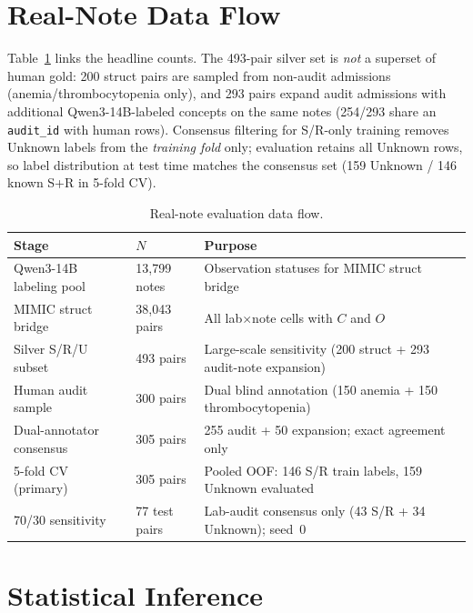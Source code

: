 \documentclass[11pt]{article}
\begin{document}
\section{Real-Note Data Flow}
\label{app:data_flow}

Table~\ref{tab:data_flow} links the headline counts. The 493-pair silver set
is \emph{not} a superset of human gold: 200 struct pairs are sampled from
non-audit admissions (anemia/thrombocytopenia only), and 293 pairs expand audit
admissions with additional Qwen3-14B-labeled concepts on the same notes
(254/293 share an \texttt{audit\_id} with human rows). Consensus filtering
for S/R-only training removes Unknown labels from the \emph{training fold} only;
evaluation retains all Unknown rows, so label distribution at test time matches
the consensus set (159 Unknown / 146 known S+R in 5-fold CV).

\begin{table}[!htbp]
  \centering
  \scriptsize
  \renewcommand{\arraystretch}{1.08}
  \caption{Real-note evaluation data flow.}
  \label{tab:data_flow}
  \begin{tabular*}{\columnwidth}{@{\extracolsep{\fill}}llp{}@{}}
    \toprule
    \textbf{Stage} & \textbf{$N$} & \textbf{Purpose} \\
    \midrule
    Qwen3-14B labeling pool & 13{,}799 notes & Observation statuses for MIMIC struct bridge \\
    MIMIC struct bridge & 38{,}043 pairs & All lab$\times$note cells with $C$ and $O$ \\
    Silver S/R/U subset & 493 pairs & Large-scale sensitivity (200 struct + 293 audit-note expansion) \\
    Human audit sample & 300 pairs & Dual blind annotation (150 anemia + 150 thrombocytopenia) \\
    Dual-annotator consensus & 305 pairs & 255 audit + 50 expansion; exact agreement only \\
    5-fold CV (primary) & 305 pairs & Pooled OOF: 146 S/R train labels, 159 Unknown evaluated \\
    70/30 sensitivity & 77 test pairs & Lab-audit consensus only (43 S/R + 34 Unknown); seed~0 \\
    \bottomrule
  \end{tabular*}
\end{table}

\section{Statistical Inference}
\label{app:statistics}
\end{document}
